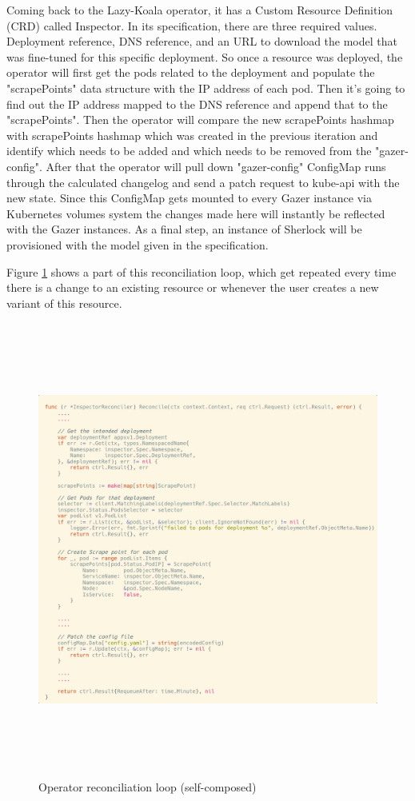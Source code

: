 Coming back to the Lazy-Koala operator, it has a Custom Resource Definition (CRD) called Inspector. In its specification, there are three required values. Deployment reference, DNS reference, and an URL to download the model that was fine-tuned for this specific deployment. So once a resource was deployed, the operator will first get the pods related to the deployment and populate the "scrapePoints" data structure with the IP address of each pod. Then it's going to find out the IP address mapped to the DNS reference and append that to the "scrapePoints". Then the operator will compare the new scrapePoints hashmap with scrapePoints hashmap which was created in the previous iteration and identify which needs to be added and which needs to be removed from the "gazer-config". After that the operator will pull down "gazer-config" ConfigMap runs through the calculated changelog and send a patch request to kube-api with the new state. Since this ConfigMap gets mounted to every Gazer instance via Kubernetes volumes system the changes made here will instantly be reflected with the Gazer instances. As a final step, an instance of Sherlock will be provisioned with the model given in the specification.

Figure \ref{fig:reconcile-loop} shows a part of this reconciliation loop, which get repeated every time there is a change to an existing resource or whenever the user creates a new variant of this resource.

\begin{figure}[H]
    \includegraphics[height=15cm]{assets/implementation/reconcile-loop.png}
    \caption{Operator reconciliation loop (self-composed)}
    \label{fig:reconcile-loop}
\end{figure}




